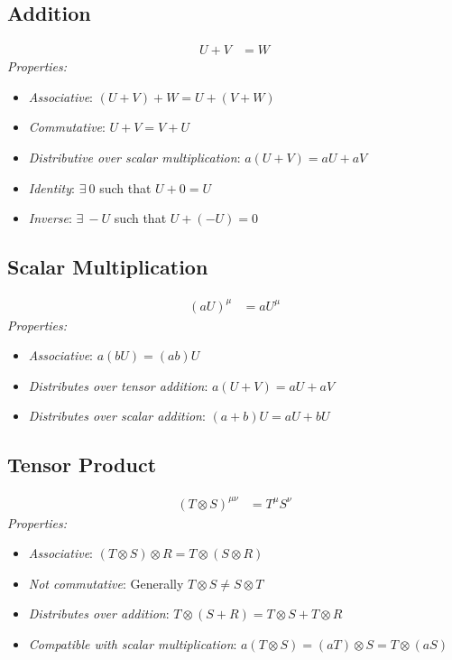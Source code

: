\documentclass{amsart}
\theoremstyle{definition}
\theoremstyle{remark}
\begin{document}
\subsection*{Addition}
\begin{align*}
U + V &= W
\end{align*}
\emph{Properties:}
\begin{itemize}
  \item \emph{Associative}: $(U + V) + W = U + (V + W)$
  \item \emph{Commutative}: $U + V = V + U$
  \item \emph{Distributive over scalar multiplication}: $a(U + V) = aU + aV$
  \item \emph{Identity}: $\exists\ 0$ such that $U + 0 = U$
  \item \emph{Inverse}: $\exists\ -U$ such that $U + (-U) = 0$
\end{itemize}

\subsection*{Scalar Multiplication}
\begin{align*}
(aU)^\mu &= a U^\mu
\end{align*}
\emph{Properties:}
\begin{itemize}
  \item \emph{Associative}: $a(bU) = (ab)U$
  \item \emph{Distributes over tensor addition}: $a(U + V) = aU + aV$
  \item \emph{Distributes over scalar addition}: $(a + b)U = aU + bU$
\end{itemize}

\subsection*{Tensor Product}
\begin{align*}
(T \otimes S)^{\mu\nu} &= T^\mu S^\nu
\end{align*}
\emph{Properties:}
\begin{itemize}
  \item \emph{Associative}: $(T \otimes S) \otimes R = T \otimes (S \otimes R)$
  \item \emph{Not commutative}: Generally $T \otimes S \neq S \otimes T$
  \item \emph{Distributes over addition}: $T \otimes (S + R) = T \otimes S + T \otimes R$
  \item \emph{Compatible with scalar multiplication}: $a(T \otimes S) = (aT) \otimes S = T \otimes (aS)$
\end{itemize}
\end{document}

